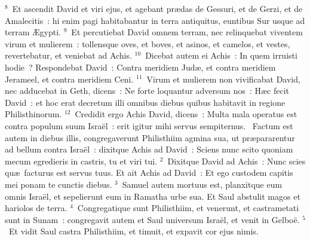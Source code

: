${}^{8}$~Et ascendit David et viri ejus, et agebant pr\ae das de Gessuri, et de Gerzi, et de Amalecitis~: hi enim pagi habitabantur in terra antiquitus, euntibus Sur usque ad terram \AE gypti.
${}^{9}$~Et percutiebat David omnem terram, nec relinquebat viventem virum et mulierem~: tollensque oves, et boves, et asinos, et camelos, et vestes, revertebatur, et veniebat ad Achis.
${}^{10}$~Dicebat autem ei Achis~: In quem irruisti hodie~? Respondebat David~: Contra meridiem Jud\ae , et contra meridiem Jerameel, et contra meridiem Ceni.
${}^{11}$~Virum et mulierem non vivificabat David, nec adducebat in Geth, dicens~: Ne forte loquantur adversum nos~: H\ae c fecit David~: et hoc erat decretum illi omnibus diebus quibus habitavit in regione Philisthinorum.
${}^{12}$~Credidit ergo Achis David, dicens~: Multa mala operatus est contra populum suum Isra\"el~: erit igitur mihi servus sempiternus.
~Factum est autem in diebus illis, congregaverunt Philisthiim agmina sua, ut pr\ae pararentur ad bellum contra Isra\"el~: dixitque Achis ad David~: Sciens nunc scito quoniam mecum egredieris in castris, tu et viri tui.
${}^{2}$~Dixitque David ad Achis~: Nunc scies qu\ae\ facturus est servus tuus. Et ait Achis ad David~: Et ego custodem capitis mei ponam te cunctis diebus.
${}^{3}$~Samuel autem mortuus est, planxitque eum omnis Isra\"el, et sepelierunt eum in Ramatha urbe sua. Et Saul abstulit magos et hariolos de terra.
${}^{4}$~Congregatique sunt Philisthiim, et venerunt, et castrametati sunt in Sunam~: congregavit autem et Saul universum Isra\"el, et venit in Gelbo\"e.
${}^{5}$~Et vidit Saul castra Philisthiim, et timuit, et expavit cor ejus nimis.


